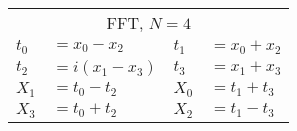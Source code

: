 \begin{tabular}{|p{4.3pt}l|p{4.3pt}l|}\toprule \multicolumn{4}{|c|}{FFT, $N=4$} \\
$t_0 $ &$= x_0 - x_2$ & $t_1 $ &$= x_0 + x_2$\\ 
$t_2 $ &$= i(x_1 - x_3)$ & $t_3 $ &$= x_1 + x_3$\\ 
$X_1 $ &$= t_0 - t_2$ & $X_0 $ &$= t_1 + t_3$\\ 
$X_3 $ &$= t_0 + t_2$ & $X_2 $ &$= t_1 - t_3$\\ 
\bottomrule\end{tabular}
